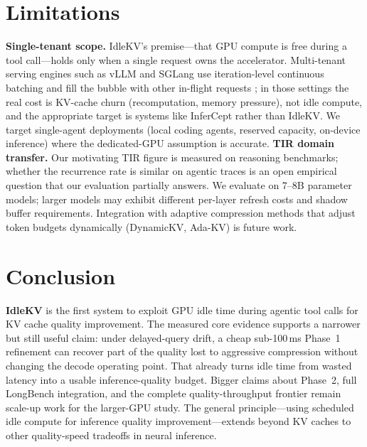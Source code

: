 \documentclass[10pt,twocolumn,letterpaper]{article}
\begin{document}
\section{Limitations}
\label{sec:limitations}

\textbf{Single-tenant scope.}
IdleKV's premise---that GPU compute is free during a tool call---holds
only when a single request owns the accelerator.
Multi-tenant serving engines such as vLLM and SGLang use iteration-level
continuous batching and fill the bubble with other in-flight requests
\citep{continuum2025}; in those settings the real cost is KV-cache churn
(recomputation, memory pressure), not idle compute, and the appropriate
target is systems like InferCept \citep{infercept2025} rather than IdleKV.
We target single-agent deployments (local coding agents, reserved capacity,
on-device inference) where the dedicated-GPU assumption is accurate.
\textbf{TIR domain transfer.}
Our motivating TIR figure \citep{lazyeviction2025} is measured on reasoning
benchmarks; whether the recurrence rate is similar on agentic traces is an
open empirical question that our evaluation partially answers.
We evaluate on 7--8B parameter models; larger models may exhibit different
per-layer refresh costs and shadow buffer requirements.
Integration with adaptive compression methods that adjust token budgets
dynamically (DynamicKV, Ada-KV) is future work.

%
\section{Conclusion}
\label{sec:conclusion}

\textbf{IdleKV} is the first system to exploit GPU idle time during agentic
tool calls for KV cache quality improvement.
The measured core evidence supports a narrower but still useful claim: under
delayed-query drift, a cheap sub-100\,ms Phase~1 refinement can
recover part of the quality lost to aggressive compression without changing the
decode operating point.
That already turns idle time from wasted latency into a usable
inference-quality budget.
Bigger claims about Phase~2, full LongBench integration, and the complete
quality-throughput frontier remain scale-up work for the larger-GPU study.
The general principle---using scheduled idle compute for inference quality
improvement---extends beyond KV caches to other quality-speed tradeoffs in
neural inference.
\end{document}
